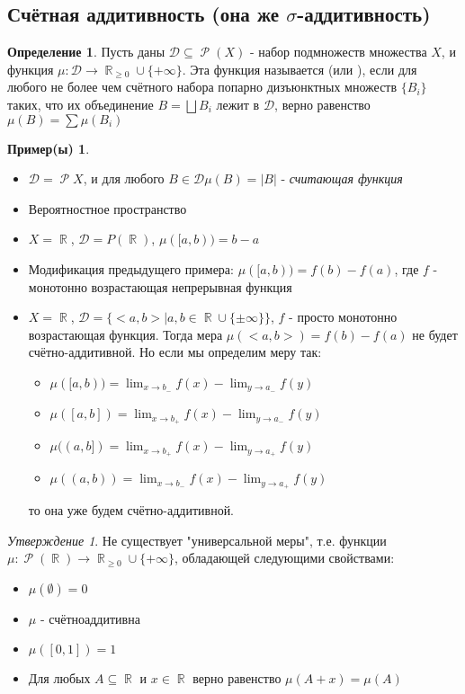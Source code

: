 \documentclass[a4paper]{article}
\theoremstyle{indented}
\theoremstyle{definition}
\newtheorem{defn}{Определение}
\newtheorem{exl}{Пример(ы)}
\theoremstyle{remark}
\newtheorem{stat}{Утверждение}
\DeclareMathOperator{\ra}{\rightarrow}
\DeclareMathOperator{\RR}{\mathbb{R}}
\DeclareMathOperator{\Rho}{\mathcal{P}}
\begin{document}
\subsection{Счётная аддитивность (она же $\sigma$-аддитивность)}
\begin{defn}
Пусть даны $\mathcal{D} \subseteq \Rho(X)$ - набор подмножеств множества $X$, и функция $\mu: \mathcal{D} \ra \RR_{\geq 0} \cup \{+\infty\}$. Эта функция называется  (или ), если для любого не более чем счётного набора попарно дизъюнктных множеств $\{B_i\}$ таких, что их объединение $B=\bigsqcup B_i$ лежит в $\mathcal{D}$, верно равенство $\mu(B)=\sum \mu(B_i)$
\end{defn}
\begin{exl}
\begin{itemize}
    \item $\mathcal{D}=\Rho{X}$, и для любого $B \in \mathcal{D} \mu(B)=|B|$ - \textit{считающая функция}
    \item Вероятностное пространство
    \item $X=\RR$, $\mathcal{D}=P(\mathcal{\RR})$, $\mu([a, b))=b-a$
    \item Модификация предыдущего примера: $\mu([a, b))=f(b)-f(a)$, где $f$ - монотонно возрастающая непрерывная функция
    \item $X=\RR$, $\mathcal{D}=\{<a, b> | a, b \in \RR \cup \{\pm \infty\}\}$, $f$ - просто монотонно возрастающая функция. Тогда мера $\mu(<a, b>)=f(b)-f(a)$ не будет счётно-аддитивной. Но если мы определим меру так:
    \begin{itemize}
        \item $\mu([a, b))=\lim_{x \ra b_-} f(x)-\lim_{y \ra a_-} f(y)$
        \item $\mu([a, b])=\lim_{x \ra b_+} f(x)-\lim_{y \ra a_-} f(y)$
        \item $\mu((a, b])=\lim_{x \ra b_+} f(x)-\lim_{y \ra a_+} f(y)$
        \item $\mu((a, b))=\lim_{x \ra b_-} f(x)-\lim_{y \ra a_+} f(y)$
    \end{itemize}
    то она уже будем счётно-аддитивной.
\end{itemize}
\end{exl}
\begin{stat}
Не существует "универсальной меры", т.е. функции $\mu: \Rho(\RR) \ra \RR_{\geq 0} \cup \{+\infty\}$, обладающей следующими свойствами:
\begin{itemize}
    \item $\mu(\emptyset)=0$
    \item $\mu$ - счётноаддитивна
    \item $\mu([0, 1])=1$
    \item Для любых $A \subseteq \RR$ и $x \in \RR$ верно равенство $\mu(A+x)=\mu(A)$
\end{itemize}
\end{stat}
\end{document}
